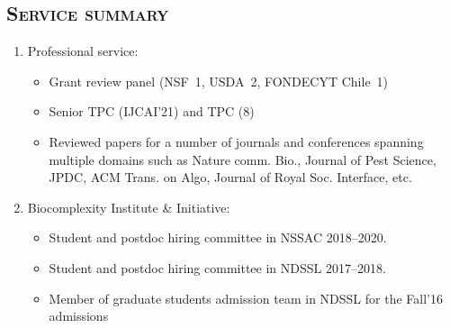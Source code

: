 \documentclass[margin,10pt]{res} %
\begin{document}
\begin{resume}
\section{\textnormal{\textsc{Service summary}}}
\begin{enumerate}[$\circ$]
    \item Professional service: 
    \begin{itemize}
        \item Grant review panel (NSF~1, USDA~2, FONDECYT Chile~1)
        \item Senior TPC (IJCAI'21) and TPC (8)
        \item Reviewed papers for a number of journals and conferences
        spanning multiple domains such as Nature comm. Bio., Journal of
        Pest Science, JPDC, ACM Trans. on Algo, Journal of Royal Soc.
        Interface, etc.
    \end{itemize}
    \item Biocomplexity Institute \& Initiative:
    \begin{itemize}
        \item Student and postdoc hiring committee in NSSAC 2018--2020.
        \item Student and postdoc hiring committee in NDSSL 2017--2018.
\item Member of graduate students admission team in NDSSL for the Fall'16
admissions
    \end{itemize}
\end{enumerate}


\end{resume}
\end{document}
